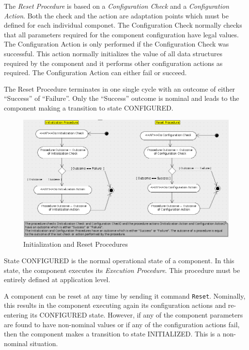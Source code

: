 \documentclass[a4paper,10pt]{article}
\begin{document}
The \textit{Reset Procedure} is based on a \textit{Configuration Check} and a \textit{Configuration Action}. Both the check and the action are adaptation points which must be defined for each individual componet. The Configuration Check normally checks that all parameters required for the component configuration have legal values.  The Configuration Action is only performed if the Configuration Check was successful. This action normally initializes the value of all data structures required by the component and it performs other configuration actions as required. The Configuration Action can either fail or succeed.

The Reset Procedure terminates in one single cycle with an outcome of either “Success” of “Failure”. Only the “Success” outcome is nominal and leads to the component making a transition to state CONFIGURED.

\begin{figure}[ht]
 \centering
 \includegraphics[scale=0.3,keepaspectratio=true]{InitializationAndReset.png}
 \caption{Initialization and Reset Procedures}
 \label{fig:InitializationAndReset}
\end{figure}

State CONFIGURED is the normal operational state of a component. In this state, the component executes its \textit{Execution Procedure}. This procedure must be entirely defined at application level. 

A component can be reset at any time by sending it command \texttt{Reset}. Nominally, this results in the component executing again its configuration actions and re-entering its CONFIGURED state. However, if any of the component parameters are found to have non-nominal values or if any of the configuration actions fail, then the component makes a transition to state INITIALIZED. This is a non-nominal situation.
\end{document}
